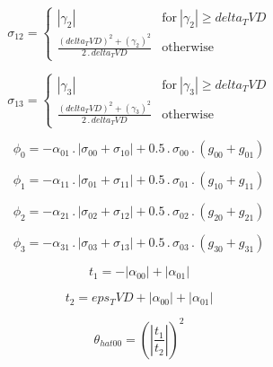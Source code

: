 \documentclass{article}
\begin{document}
\begin{dmath}\sigma_{1 2} = \begin{cases} \left|{\gamma_{2}}\right| & \text{for}\: \left|{\gamma_{2}}\right| \geq delta_TVD \\\frac{\left(delta_TVD \right)^{2} + \left(\gamma_{2} \right)^{2}}{2 \,.\, delta_TVD} & \text{otherwise} 
\end{cases}\end{dmath}

\begin{dmath}\sigma_{1 3} = \begin{cases} \left|{\gamma_{3}}\right| & \text{for}\: \left|{\gamma_{3}}\right| \geq delta_TVD \\\frac{\left(delta_TVD \right)^{2} + \left(\gamma_{3} \right)^{2}}{2 \,.\, delta_TVD} & \text{otherwise} 
\end{cases}\end{dmath}

\begin{dmath}\phi_{0} = - \alpha_{01} \,.\, \left|{\sigma_{0 0} + \sigma_{1 0}}\right| + 0.5 \,.\, \sigma_{0 0} \,.\, \left(g_{00} + g_{01}\right)\end{dmath}

\begin{dmath}\phi_{1} = - \alpha_{11} \,.\, \left|{\sigma_{0 1} + \sigma_{1 1}}\right| + 0.5 \,.\, \sigma_{0 1} \,.\, \left(g_{10} + g_{11}\right)\end{dmath}

\begin{dmath}\phi_{2} = - \alpha_{21} \,.\, \left|{\sigma_{0 2} + \sigma_{1 2}}\right| + 0.5 \,.\, \sigma_{0 2} \,.\, \left(g_{20} + g_{21}\right)\end{dmath}

\begin{dmath}\phi_{3} = - \alpha_{31} \,.\, \left|{\sigma_{0 3} + \sigma_{1 3}}\right| + 0.5 \,.\, \sigma_{0 3} \,.\, \left(g_{30} + g_{31}\right)\end{dmath}

\begin{dmath}t_{1} = - \left|{\alpha_{00}}\right| + \left|{\alpha_{01}}\right|\end{dmath}

\begin{dmath}t_{2} = eps_TVD + \left|{\alpha_{00}}\right| + \left|{\alpha_{01}}\right|\end{dmath}

\begin{dmath}\theta_{hat 00} = \left(\left|{\frac{t_{1}}{t_{2}}}\right| \right)^{2}\end{dmath}
\end{document}
